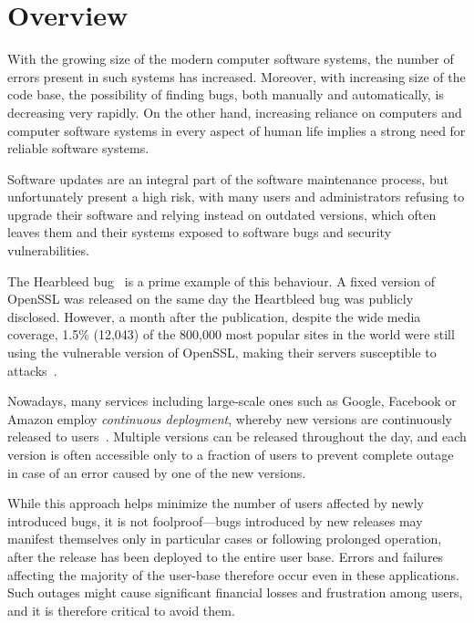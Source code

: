 \chapter{Overview}
\label{chap:overview}

With the growing size of the modern computer software systems, the number of
errors present in such systems has increased.  Moreover, with increasing size
of the code base, the possibility of finding bugs, both manually and
automatically, is decreasing very rapidly. On the other hand, increasing
reliance on computers and computer software systems in every aspect of human
life implies a strong need for reliable software systems.

Software updates are an integral part of the software maintenance process, but
unfortunately present a high risk, with many users and administrators refusing
to upgrade their software and relying instead on outdated versions, which often
leaves them and their systems exposed to software bugs and security
vulnerabilities.

The Hearbleed bug~\cite{heartbleed} is a prime example of this behaviour. A
fixed version of OpenSSL was released on the same day the Heartbleed bug was
publicly disclosed.  However, a month after the publication, despite the wide
media coverage, 1.5\% (12,043) of the 800,000 most popular sites in the world
were still using the vulnerable version of OpenSSL, making their servers
susceptible to attacks~\cite{heartbleed-prevalent}.

Nowadays, many services including large-scale ones such as Google, Facebook or
Amazon employ \emph{continuous deployment}, whereby new versions are
continuously released to users~\cite{johnson2009}. Multiple versions can be
released throughout the day, and each version is often accessible only to a
fraction of users to prevent complete outage in case of an error caused by one
of the new versions.

While this approach helps minimize the number of users affected by newly
introduced bugs, it is not foolproof---bugs introduced by new releases may
manifest themselves only in particular cases or following prolonged operation,
after the release has been deployed to the entire user base. Errors and
failures affecting the majority of the user-base therefore occur even in these
applications. Such outages might cause significant financial losses and
frustration among users, and it is therefore critical to avoid them.

